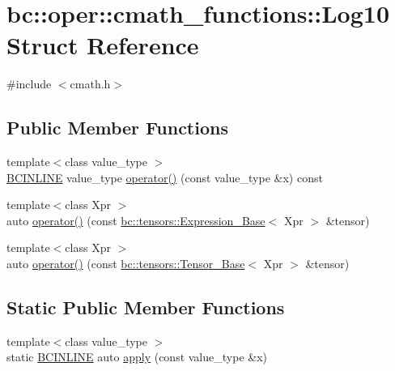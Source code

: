 \hypertarget{structbc_1_1oper_1_1cmath__functions_1_1Log10}{}\section{bc\+:\+:oper\+:\+:cmath\+\_\+functions\+:\+:Log10 Struct Reference}
\label{structbc_1_1oper_1_1cmath__functions_1_1Log10}


{\ttfamily \#include $<$cmath.\+h$>$}

\subsection*{Public Member Functions}
\begin{DoxyCompactItemize}
\item 
{\footnotesize template$<$class value\+\_\+type $>$ }\\\hyperlink{common_8h_a6699e8b0449da5c0fafb878e59c1d4b1}{B\+C\+I\+N\+L\+I\+NE} value\+\_\+type \hyperlink{structbc_1_1oper_1_1cmath__functions_1_1Log10_ae07c8e819aa6e8977c29f4a75bfad381}{operator()} (const value\+\_\+type \&x) const
\item 
{\footnotesize template$<$class Xpr $>$ }\\auto \hyperlink{structbc_1_1oper_1_1cmath__functions_1_1Log10_a2ff90defda2fbbd87d4dd4135bd6bfe7}{operator()} (const \hyperlink{classbc_1_1tensors_1_1Expression__Base}{bc\+::tensors\+::\+Expression\+\_\+\+Base}$<$ Xpr $>$ \&tensor)
\item 
{\footnotesize template$<$class Xpr $>$ }\\auto \hyperlink{structbc_1_1oper_1_1cmath__functions_1_1Log10_ae88de77a67b4808b671d96cf1908c0d6}{operator()} (const \hyperlink{classbc_1_1tensors_1_1Tensor__Base}{bc\+::tensors\+::\+Tensor\+\_\+\+Base}$<$ Xpr $>$ \&tensor)
\end{DoxyCompactItemize}
\subsection*{Static Public Member Functions}
\begin{DoxyCompactItemize}
\item 
{\footnotesize template$<$class value\+\_\+type $>$ }\\static \hyperlink{common_8h_a6699e8b0449da5c0fafb878e59c1d4b1}{B\+C\+I\+N\+L\+I\+NE} auto \hyperlink{structbc_1_1oper_1_1cmath__functions_1_1Log10_ac4260f0f515a806d67f7584956614bdf}{apply} (const value\+\_\+type \&x)
\end{DoxyCompactItemize}


